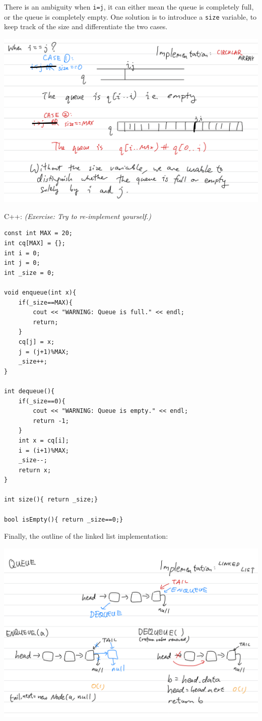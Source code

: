 There is an ambiguity when \texttt{i=j}, it can either mean the queue is completely full, or the queue is completely empty. One solution is to introduce a \texttt{size} variable, to keep track of the size and differentiate the two cases.

\includegraphics[width=14cm]{images/ch6-cqij.png}

C++: \textit{(Exercise:  Try to re-implement yourself.)}

\begin{lstlisting}
const int MAX = 20; 
int cq[MAX] = {};
int i = 0;
int j = 0;
int _size = 0;

void enqueue(int x){
    if(_size==MAX){
        cout << "WARNING: Queue is full." << endl;
        return;
    }
    cq[j] = x;
    j = (j+1)%MAX;
    _size++;
}

int dequeue(){
    if(_size==0){
        cout << "WARNING: Queue is empty." << endl;
        return -1;
    }
    int x = cq[i];
    i = (i+1)%MAX;
    _size--;
    return x;
}

int size(){ return _size;}

bool isEmpty(){ return _size==0;}
\end{lstlisting}
\vspace{6mm}

Finally, the outline of the linked list implementation:

\includegraphics[width=14cm]{images/ch6-qlinkedlist.png}